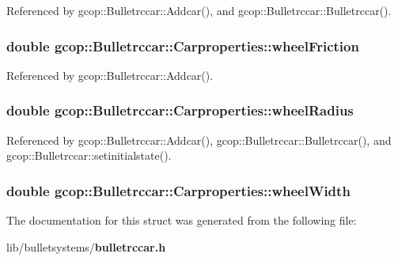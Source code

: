 \-Referenced by gcop\-::\-Bulletrccar\-::\-Addcar(), and gcop\-::\-Bulletrccar\-::\-Bulletrccar().

\subsubsection[{wheel\-Friction}]{\setlength{\rightskip}{0pt plus 5cm}double {\bf gcop\-::\-Bulletrccar\-::\-Carproperties\-::wheel\-Friction}}\label{structgcop_1_1Bulletrccar_1_1Carproperties_a991beeddb1f6b65e814b33990b02fbbf}


\-Referenced by gcop\-::\-Bulletrccar\-::\-Addcar().

\subsubsection[{wheel\-Radius}]{\setlength{\rightskip}{0pt plus 5cm}double {\bf gcop\-::\-Bulletrccar\-::\-Carproperties\-::wheel\-Radius}}\label{structgcop_1_1Bulletrccar_1_1Carproperties_aa4430a9cb28189aa196fa179988b4812}


\-Referenced by gcop\-::\-Bulletrccar\-::\-Addcar(), gcop\-::\-Bulletrccar\-::\-Bulletrccar(), and gcop\-::\-Bulletrccar\-::setinitialstate().

\subsubsection[{wheel\-Width}]{\setlength{\rightskip}{0pt plus 5cm}double {\bf gcop\-::\-Bulletrccar\-::\-Carproperties\-::wheel\-Width}}\label{structgcop_1_1Bulletrccar_1_1Carproperties_a89d393ccbcc18270bbad905586c53977}


\-The documentation for this struct was generated from the following file\-:\begin{DoxyCompactItemize}
\item 
lib/bulletsystems/{\bf bulletrccar.\-h}\end{DoxyCompactItemize}
